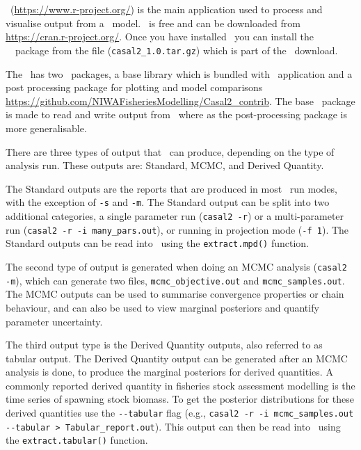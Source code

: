 \section{ \label{sec:PostProcessing}}

\R\ (\url{https://www.r-project.org/}) is the main application used to process and visualise output from a \CNAME\ model. \R\ is free and can be downloaded from \url{https://cran.r-project.org/}. Once you have installed \R\ you can install the \cname\ \R\ package from the file (\texttt{casal2\_1.0.tar.gz}) which is part of the \CNAME\ download.

The \CNAME\ has two \R\ packages, a base library which is bundled with \CNAME\ application and a post processing package for plotting and model comparisons \url{https://github.com/NIWAFisheriesModelling/Casal2_contrib}. The base \R\ package is made to read and write output from \CNAME\ where as the post-processing package is more generalisable. 

There are three types of output that \CNAME\ can produce, depending on the type of analysis run. These outputs are: Standard, MCMC, and Derived Quantity.

The Standard outputs are the reports that are produced in most \CNAME\ run modes, with the exception of \texttt{-s} and \texttt{-m}. The Standard output can be split into two additional categories, a single parameter run (\texttt{casal2 -r}) or a multi-parameter run (\texttt{casal2 -r -i many\_pars.out}), or running in projection mode (\texttt{-f 1}). The Standard outputs can be read into \R\ using the \texttt{extract.mpd()} function.

The second type of output is generated when doing an MCMC analysis (\texttt{casal2 -m}), which can generate two files, \texttt{mcmc\_objective.out} and \texttt{mcmc\_samples.out}. The MCMC outputs can be used to summarise convergence properties or chain behaviour, and can also be used to view marginal posteriors and quantify parameter uncertainty.

The third output type is the Derived Quantity outputs, also referred to as tabular output. The Derived Quantity output can be generated after an MCMC analysis is done, to produce the marginal posteriors for derived quantities. A commonly reported derived quantity in fisheries stock assessment modelling is the time series of spawning stock biomass. To get the posterior distributions for these derived quantities use the \texttt{-{}-tabular} flag (e.g., \texttt{casal2 -r -i mcmc\_samples.out -{}-tabular > Tabular\_report.out}). This output can then be read into \R\ using the \texttt{extract.tabular()} function.

